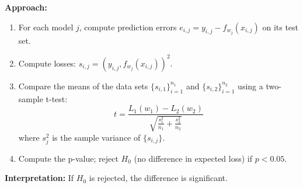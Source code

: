 \documentclass{beamer}
\begin{document}
\begin{frame}
\textbf{Approach:}
\begin{enumerate}
    \item For each model $j$, compute prediction errors $e_{i,j} = y_{i,j} - f_{w_j}(x_{i,j})$ on its test set.
    \item Compute losses: $s_{i,j} = (y_{i,j}, f_{w_j}(x_{i,j}))^2$.
    \item Compare the means %
    of the data sets $\{s_{i,1}\}_{i=1}^{n_1}$ and $\{s_{i,2}\}_{i=1}^{n_2}$ using a two-sample t-test:
    \[
    t = \frac{L_1(w_1) - L_2(w_2)}{\sqrt{\frac{s_1^2}{n_1} + \frac{s_2^2}{n_2}}}
    \]
    where $s_j^2$ is the sample variance of $\{s_{i,j}\}$.
    \item Compute the p-value; reject $H_0$ (no difference in expected loss) if $p < 0.05$.
\end{enumerate}

\textbf{Interpretation:}  
If $H_0$ is rejected, the difference is significant.

\end{frame}
\end{document}
